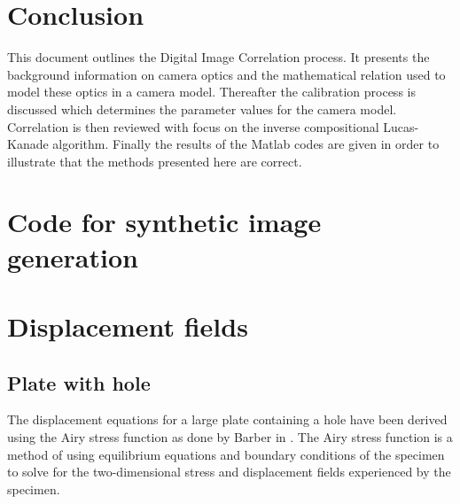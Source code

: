 \documentclass[12pt,oneside,openany,a4paper, %
english, %
masters-t, goldenblock]{usthesis}
\begin{document}
\chapter{Conclusion}
This document outlines the Digital Image Correlation process. It presents the background information on camera optics and the mathematical relation used to model these optics in a camera model. Thereafter the calibration process is discussed which determines the parameter values for the camera model. Correlation is then reviewed with focus on the inverse compositional Lucas-Kanade algorithm. Finally the results of the Matlab codes are given in order to illustrate that the methods presented here are correct.





\begin{appendices}
\chapter{Code for synthetic image generation}
\label{ap: synthetic image}



\chapter{Displacement fields}
\section{Plate with hole}
\label{ap: plate hole}
The displacement equations for a large plate containing a hole have been derived using the Airy stress function as done by Barber in \cite{barber2002solid}. The Airy stress function is a method of using equilibrium equations and boundary conditions of the specimen to solve for the two-dimensional stress and displacement fields experienced by the specimen.


\end{appendices}
\end{document}
